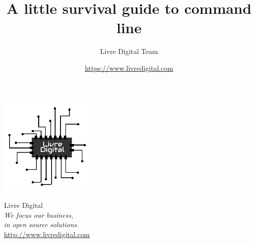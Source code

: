 \documentclass{beamer}
\title{A little survival guide to command line}
\author{Livre Digital Team}
\institute{info@livredigital.com}
\date{\url{https://www.livredigital.com}}
\begin{document}
\begin{frame}[t]
    \centering
    \parbox{0.995\textwidth}{    
    \begin{minipage}{.20\linewidth}
        \vspace{20pt}
        \begin{minipage}{0.40\textwidth}
            \includegraphics[width=\linewidth]{imgs/logo.png}\\
        \end{minipage}
        \begin{minipage}{0.50\textwidth}
            \vspace{20pt}
            Livre Digital\\[0.65cm]
            \small{\emph{We focus our business,\\in open source solutions.}}\\[0.65cm]
            \url{http://www.livredigital.com}
            \vspace{35pt}
        \end{minipage}
    \end{minipage}
    \begin{minipage}[t]{.005\linewidth}
        \hspace{\fill}
    \end{minipage}
    \begin{minipage}{.50\linewidth}

\end{minipage}}
\end{frame}
\end{document}

